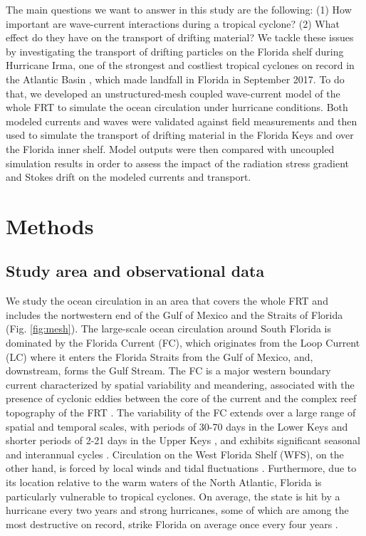 The main questions we want to answer in this study are the following: (1) How important are wave-current interactions during a tropical cyclone? (2) What effect do they have on the transport of drifting material? We tackle these issues by investigating the transport of drifting particles on the Florida shelf during Hurricane Irma, one of the strongest and costliest tropical cyclones on record in the Atlantic Basin \citep{xian2018brief}, which made landfall in Florida in September 2017. To do that, we developed an unstructured-mesh coupled wave-current model of the whole FRT to simulate the ocean circulation under hurricane conditions. Both modeled currents and waves were validated against field measurements and then used to simulate the transport of drifting material in the Florida Keys and over the Florida inner shelf. Model outputs were then compared with uncoupled simulation results in order to assess the impact of the radiation stress gradient and Stokes drift on the modeled currents and transport.  

\section{Methods}
\subsection{Study area and observational data}
We study the ocean circulation in an area that covers the whole FRT and includes the nortwestern end of the Gulf of Mexico and the Straits of Florida (Fig. \ref{fig:mesh}). The large-scale ocean circulation around South Florida is dominated by the Florida Current (FC), which originates from the Loop Current (LC) where it enters the Florida Straits from the Gulf of Mexico, and, downstream, forms the Gulf Stream. The FC is a major western boundary current characterized by spatial variability and meandering, associated with the presence of cyclonic eddies between the core of the current and the complex reef topography of the FRT \citep{lee1995florida,kourafalou2012florida}. The variability of the FC extends over a large range of spatial and temporal scales, with periods of 30-70 days in the Lower Keys \citep{lee1995florida} and shorter periods of 2-21 days in the Upper Keys \citep{lee1977low}, and exhibits significant seasonal and interannual cycles \citep{johns1987meandering, lee1988wind,schott1988variability}. Circulation on the West Florida Shelf (WFS), on the other hand, is forced by local winds and tidal fluctuations \citep{lee2002volume,liu2012seasonal}. Furthermore, due to its location relative to the warm waters of the North Atlantic, Florida is particularly vulnerable to tropical cyclones. On average, the state is hit by a hurricane every two years and strong hurricanes, some of which are among the most destructive on record, strike Florida on average once every four years \citep{malmstadt2009florida}.

